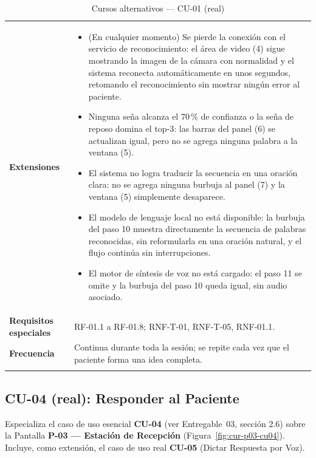 \begin{longtable}{@{}p{4.1cm} >{\raggedright\arraybackslash}p{11.2cm}@{}}
\toprule
\textbf{Extensiones} &
\begin{itemize}[leftmargin=*, itemsep=2pt]
    \item[*a.] (En cualquier momento) Se pierde la conexión con el
    servicio de reconocimiento: el área de video (4) sigue mostrando la
    imagen de la cámara con normalidad y el sistema reconecta
    automáticamente en unos segundos, retomando el reconocimiento sin
    mostrar ningún error al paciente.
    \item[5a.] Ninguna seña alcanza el 70\,\% de confianza o la seña de
    reposo domina el top-3: las barras del panel (6) se actualizan igual,
    pero no se agrega ninguna palabra a la ventana (5).
    \item[10a.] El sistema no logra traducir la secuencia en una oración
    clara: no se agrega ninguna burbuja al panel (7) y la ventana (5)
    simplemente desaparece.
    \item[10b.] El modelo de lenguaje local no está disponible: la
    burbuja del paso 10 muestra directamente la secuencia de palabras
    reconocidas, sin reformularla en una oración natural, y el flujo
    continúa sin interrupciones.
    \item[11a.] El motor de síntesis de voz no está cargado: el paso 11
    se omite y la burbuja del paso 10 queda igual, sin audio asociado.
\end{itemize} \\
\textbf{Requisitos especiales} & RF-01.1 a RF-01.8; RNF-T-01, RNF-T-05, RNF-01.1. \\
\textbf{Frecuencia} &
Continua durante toda la sesión; se repite cada vez que el paciente forma
una idea completa. \\
\bottomrule
\caption{Cursos alternativos --- CU-01 (real)}
\end{longtable}

\subsection{CU-04 (real): Responder al Paciente}

Especializa el caso de uso esencial \textbf{CU-04} (ver Entregable~03,
sección 2.6) sobre la Pantalla \textbf{P-03 --- Estación de Recepción}
(Figura~\ref{fig:cur-p03-cu04}). Incluye, como extensión, el caso de uso
real \textbf{CU-05} (Dictar Respuesta por Voz).

